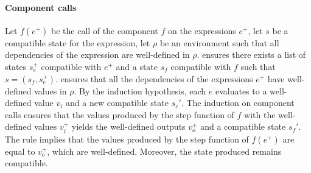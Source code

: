 \begin{skippableproof}
    \paragraph{Component calls}
    Let $f(e^+)$ be the call of the component $f$ on the expressions $e^+$, let $s$ be a compatible
    state for the expression, let $\rho$ be an environment such that all dependencies of the
    expression are well-defined in $\rho$.
     ensures there exists a list of states $s_e^+$
    compatible with $e^+$ and a state $s_f$ compatible with $f$ such that $s = (s_f, s_e^+)$.
     ensures that all the dependencies
    of the expressions $e^+$ have well-defined values in $\rho$.
    By the induction hypothesis, each $e$ evaluates to a well-defined value $v_i$ and a new
    compatible state $s_e'$. The induction on component calls ensures that the values produced by
    the step function of $f$ with the well-defined values $v_i^+$ yields the well-defined outputs
    $v_o^+$ and a compatible state $s_f'$. The rule
    implies that the values produced by the step function of $f(e^+)$ are equal to $v_o^+$, which
    are well-defined. Moreover, the state produced remains compatible.

    \setcounter{paragraph}{0}
\end{skippableproof}

